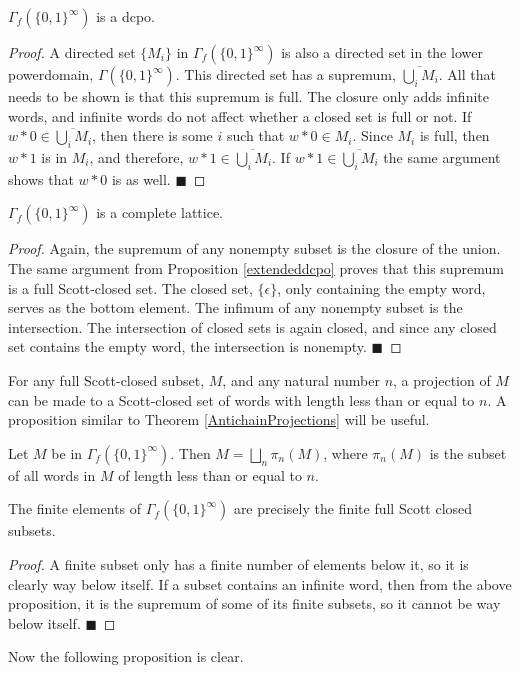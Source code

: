 \begin{proposition}\label{extendeddcpo}
$\Gamma_{f}(\{0,1\}^\infty)$ is a dcpo.
\end{proposition}
\begin{proof}
A directed set $\{M_i\}$ in $\Gamma_{f}(\{0,1\}^\infty)$ is also a directed set in the lower powerdomain, $\Gamma(\{0,1\}^\infty)$.  This directed set has a supremum, $\overline{\bigcup_i M_i}$.  All that needs to be shown is that this supremum is full.  The closure only adds infinite words, and infinite words do not affect whether a closed set is full or not.  If $w*0\in \overline{\bigcup_i M_i}$, then there is some $i$ such that $w*0 \in M_i$.  Since $M_i$ is full, then $w*1$ is in $M_i$, and therefore, $w*1 \in \overline{\bigcup_i M_i}$.  If $w*1\in \overline{\bigcup_i M_i}$ the same argument shows that $w*0$ is as well.
\hfill $\blacksquare$
\end{proof}

\begin{proposition}\label{ExtendedLattice}
$\Gamma_{f}(\{0,1\}^\infty)$ is a complete lattice.
\end{proposition}
\begin{proof}
Again, the supremum of any nonempty subset is the closure of the union.  The same argument from Proposition \ref{extendeddcpo} proves that this supremum is a full Scott-closed set.  The closed set, $\{\epsilon\}$, only containing the empty word, serves as the bottom element.  The infimum of any nonempty subset is the intersection.  The intersection of closed sets is again closed, and since any closed set contains the empty word, the intersection is nonempty.
\hfill $\blacksquare$
\end{proof}

For any full Scott-closed subset, $M$, and any natural number $n$, a projection of $M$ can be made to a Scott-closed set of words with length less than or equal to $n$.  A proposition similar to Theorem \ref{AntichainProjections} will be useful.

\begin{proposition}\label{ExtendedProjections}
Let $M$ be in $\Gamma_{f}(\{0,1\}^\infty)$.  Then $M = \bigsqcup_n \pi_n(M)$, where $\pi_n(M)$ is the subset of all words in $M$ of length less than or equal to $n$.
\end{proposition}

\begin{lemma}
The finite elements of $\Gamma_{f}(\{0,1\}^\infty)$ are precisely the finite full Scott closed subsets.
\end{lemma}
\begin{proof}
A finite subset only has a finite number of elements below it, so it is clearly way below itself.  If a subset contains an infinite word, then from the above proposition, it is the supremum of some of its finite subsets, so it cannot be way below itself.
\hfill $\blacksquare$
\end{proof}
Now the following proposition is clear.

